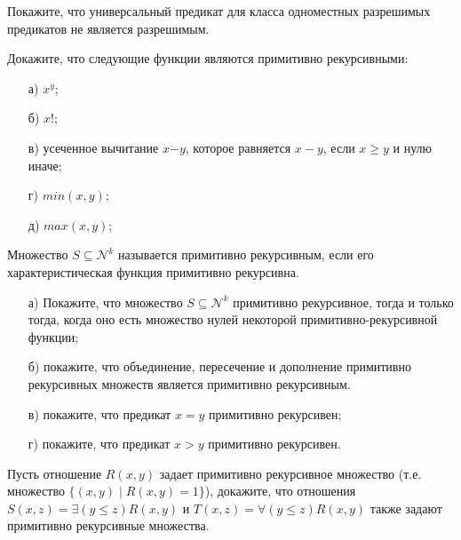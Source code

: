 
\newcommand{\dom}[2]{\left[\frac{#1}{#2}\right]}

\begin{task}
	Покажите, что универсальный предикат для класса одноместных разрешимых предикатов не является разрешимым.
\end{task}


\begin{task}
    Докажите, что следующие функции являются примитивно рекурсивными:
    \begin{enumerate}[topsep = 0pt, itemsep = -1ex]
        \item [а)] $x^y$;
        \item [б)] $x!$;
        \item [в)] усеченное вычитание $x \dot{-} y$, которое равняется $x - y$, если $x \ge y$ и нулю иначе; 
    	\item [г)] $min(x, y)$;
        \item [д)] $max(x, y)$;
    \end{enumerate}
\end{task}


\vspace{0.5cm}

Множество $S \subseteq \mathcal{N}^k$ называется примитивно рекурсивным, если его характеристическая функция примитивно
рекурсивна.

\begin{task}	
    \begin{enumerate}[topsep = 0pt, itemsep = -1ex]
        \item [а)] Покажите, что множество $S \subseteq \mathcal{N}^k$ примитивно рекурсивное, тогда и только тогда, когда оно
			есть множество нулей некоторой примитивно-рекурсивной функции;
        \item [б)] покажите, что объединение, пересечение и дополнение примитивно рекурсивных множеств является примитивно
			рекурсивным.
        \item [в)] покажите, что предикат $x = y$ примитивно рекурсивен;
        \item [г)] покажите, что предикат $x > y$ примитивно рекурсивен.
    \end{enumerate}
\end{task}


\begin{task}
    Пусть отношение $R(x, y)$ задает примитивно рекурсивное множество (т.е. множество $\{(x, y) \mid R(x, y) = 1\}$), докажите,
    что отношения $S(x, z) = \exists (y \le z) R(x, y)$ и $T(x, z) = \forall (y \le z) R(x, y)$ также задают примитивно
    рекурсивные множества.
\end{task}

